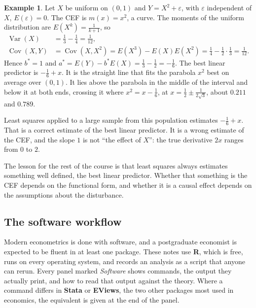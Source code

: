 \documentclass[11pt,a4paper]{article}
\numberwithin{equation}{section}
\DeclareMathOperator{\Var}{Var}
\DeclareMathOperator{\Cov}{Cov}
\theoremstyle{definition}
\newtheorem{exa}[thm]{Example}
\begin{document}
\begin{exa}
\label{ex:blp}
Let $X$ be uniform on $(0, 1)$ and $Y = X^2 + \varepsilon$, with $\varepsilon$ independent of $X$, $E(\varepsilon) = 0$. The CEF is $m(x) = x^2$, a curve.
The moments of the uniform distribution are $E(X^k) = \frac{1}{k+1}$, so
\begin{align*}
\Var(X) &= \tfrac13 - \tfrac14 = \tfrac{1}{12},\\
\Cov(X, Y) &= \Cov(X, X^2) = E(X^3) - E(X)E(X^2) = \tfrac14 - \tfrac12\cdot\tfrac13 = \tfrac{1}{12} .
\end{align*}
Hence $b^* = 1$ and $a^* = E(Y) - b^*E(X) = \frac13 - \frac12 = -\frac16$. The best linear predictor is $-\frac16 + x$. It is the straight line that
fits the parabola $x^2$ best on average over $(0, 1)$. It lies above the parabola in the middle of the interval and below it at both ends,
crossing it where $x^2 = x - \frac16$, at $x = \frac12 \pm \frac{1}{2\sqrt3}$, about $0.211$ and $0.789$.

Least squares applied to a large sample from this population estimates $-\frac16 + x$. That is a correct estimate of the best linear
predictor. It is a wrong estimate of the CEF, and the slope $1$ is not ``the effect of $X$'': the true derivative $2x$ ranges from $0$ to $2$.
\end{exa}

The lesson for the rest of the course is that least squares always estimates something well defined, the best linear predictor. Whether that
something is the CEF depends on the functional form, and whether it is a causal effect depends on the assumptions about the
disturbance.

\subsection{The software workflow}
\label{ssec:software}

Modern econometrics is done with software, and a postgraduate economist is expected to be fluent in at least one package. These notes use
\textbf{R}, which is free, runs on every operating system, and records an analysis as a script that anyone can rerun. Every panel marked
\emph{Software} shows commands, the output they actually print, and how to read that output against the theory. Where a command differs
in \textbf{Stata} or \textbf{EViews}, the two other packages most used in economics, the equivalent is given at the end of the panel.
\end{document}
